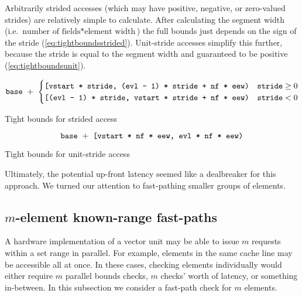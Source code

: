 Arbitrarily strided accesses (which may have positive, negative, or zero-valued strides) are relatively simple to calculate.
After calculating the segment width (i.e. $\text{number of fields} * \text{element width}$) the full bounds just depends on the sign of the stride (\cref{eq:tightboundsstrided}).
Unit-stride accesses simplify this further, because the stride is equal to the segment width and guaranteed to be positive (\cref{eq:tightboundsunit}).

\newcommand{\vstart}{\code{vstart}}
\newcommand{\vstartactive}{\code{vstart}}
\newcommand{\evl}{\code{evl}}
\newcommand{\evlactive}{\code{evl}}
\newcommand{\baseaddr}{\code{base}}

\begin{mycapequ}[!ht]

\begin{equation}\label{eq:tightboundsstrided}
\baseaddr{}\ +\ \begin{cases}
        \code{[\vstartactive{} * \code{stride}, (\evlactive{} - 1) * \code{stride} + \code{nf} * \code{eew})} & \code{stride} \ge 0 \\
            
        \code{[(\evlactive{} - 1) * \code{stride}, \vstartactive{} * \code{stride} + \code{nf} * \code{eew})} & \code{stride} < 0
    \end{cases}
\end{equation}
\caption{Tight bounds for strided access}
\end{mycapequ}

\begin{mycapequ}[!ht]
\begin{equation}\label{eq:tightboundsunit}
    \baseaddr{}\ +\ \code{[\vstartactive{} * \code{nf} * \code{eew}, \evlactive{} * \code{nf} * \code{eew})}
\end{equation}
\caption{Tight bounds for unit-stride access}
\end{mycapequ}

Ultimately, the potential up-front latency seemed like a dealbreaker for this approach.
We turned our attention to fast-pathing smaller groups of elements.

\subsection{$m$-element known-range fast-paths}
A hardware implementation of a vector unit may be able to issue $m$ requests within a set range in parallel.
For example, elements in the same cache line may be accessible all at once.
In these cases, checking elements individually would either require $m$ parallel bounds checks, $m$ checks' worth of latency, or something in-between.
In this subsection we consider a fast-path check for $m$ elements. 

